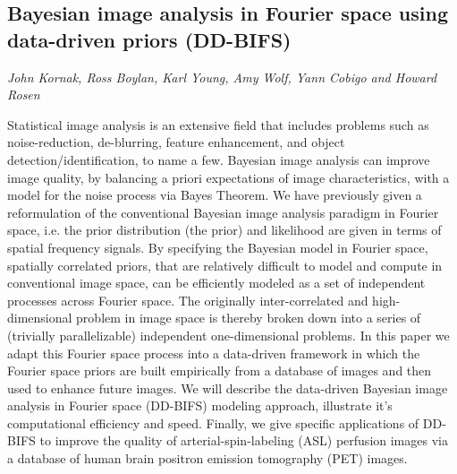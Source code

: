 \documentclass[../booklet.tex]{subfiles}
\begin{document}
\subsection[Bayesian image analysis in Fourier space using data-driven priors (DD-BIFS). {\it John Kornak, Ross Boylan, Karl Young, Amy Wolf, Yann Cobigo and Howard Rosen}]{Bayesian image analysis in Fourier space using data-driven priors (DD-BIFS)}
     

\begin{center}
  {\it John Kornak, Ross Boylan, Karl Young, Amy Wolf, Yann Cobigo and Howard Rosen}
\end{center}

\vskip 0.8cm


Statistical image analysis is an extensive field that includes problems such as noise-reduction, de-blurring, feature enhancement, and object detection/identification, to name a few. Bayesian image analysis can improve image quality, by balancing a priori expectations of image characteristics, with a model for the noise process via Bayes Theorem. We have previously given a reformulation of the conventional Bayesian image analysis paradigm in Fourier space, i.e. the prior distribution (the prior) and likelihood are given in terms of spatial frequency signals. By specifying the Bayesian model in Fourier space, spatially correlated priors, that are relatively difficult to model and compute in conventional image space, can be efficiently modeled as a set of independent processes across Fourier space. The originally inter-correlated and high-dimensional problem in image space is thereby broken down into a series of (trivially parallelizable) independent one-dimensional problems. In this paper we adapt this Fourier space process into a data-driven framework in which the Fourier space priors are built empirically from a database of images and then used to enhance future images. We will describe the data-driven Bayesian image analysis in Fourier space (DD-BIFS) modeling approach, illustrate it's computational efficiency and speed. Finally, we give specific applications of DD-BIFS to improve the quality of arterial-spin-labeling (ASL) perfusion images via a database of human brain positron emission tomography (PET) images.

\end{document}
